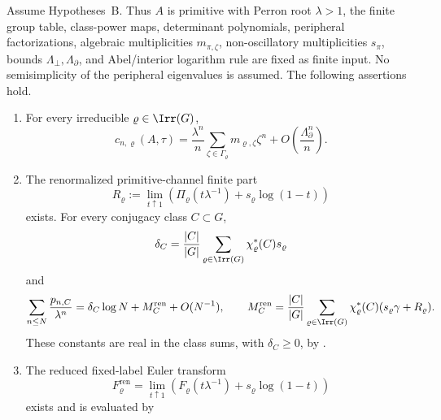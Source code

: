 \begin{theorem}
  \label{thm:perron-boundary-determinant-product}
  \label{thm:peripheral-primitive-channel-asymptotic}
  \label{thm:renormalized-class-mertens}
  \label{thm:renormalized-fixed-label-determinant}
  \label{thm:renormalized-frobenius-product}
  Assume Hypotheses~B.  Thus \(A\) is primitive with Perron root
  \(\lambda>1\), the finite group table, class-power maps, determinant
  polynomials, peripheral factorizations, algebraic multiplicities
  \(m_{\pi,\zeta}\), non-oscillatory multiplicities \(s_\pi\), bounds
  \(\Lambda_\perp,\Lambda_\partial\), and Abel/interior logarithm rule are
  fixed as finite input.  No semisimplicity of the peripheral eigenvalues is
  assumed.  The following assertions hold.
  \begin{enumerate}[label=\textup{(\roman*)},leftmargin=*]
  \item For every irreducible \(\varrho\in\Irr(G)\),
  \begin{equation}\label{eq:peripheral-primitive-channel-asymptotic}
    c_{n,\varrho}(A,\tau)
    =
    \frac{\lambda^n}{n}
      \sum_{\zeta\in\Gamma_\varrho}m_{\varrho,\zeta}\zeta^n
    +
    O\!\left(\frac{\Lambda_\partial^n}{n}\right).
  \end{equation}
  \item The renormalized primitive-channel finite part
  \[
    R_\varrho:=
    \lim_{t\uparrow1}
      \left(\Pi_\varrho(t\lambda^{-1})+s_\varrho\log(1-t)\right)
  \]
  exists.  For every conjugacy class \(C\subset G\),
  \[
    \delta_C=
    \frac{|C|}{|G|}
      \sum_{\varrho\in\Irr(G)}\chi_\varrho^\ast(C)s_\varrho
  \]
  and
  \begin{equation}\label{eq:perron-boundary-main-class-mertens}
    \sum_{n\le N}\frac{p_{n,C}}{\lambda^n}
    =
    \delta_C\log N+M_C^{\mathrm{ren}}+O(N^{-1}),
    \qquad
    M_C^{\mathrm{ren}}=
    \frac{|C|}{|G|}
      \sum_{\varrho\in\Irr(G)}
        \chi_\varrho^\ast(C)(s_\varrho\gamma+R_\varrho).
  \end{equation}
  These constants are real in the class sums, with
  \(\delta_C\ge0\), by
  .
  \item The reduced fixed-label Euler transform
  \[
    F_\varrho^{\mathrm{ren}}
    =
    \lim_{t\uparrow1}
      \left(F_\varrho(t\lambda^{-1})+s_\varrho\log(1-t)\right)
  \]
  exists and is evaluated by
  \begin{equation}\label{eq:perron-boundary-main-fixed-label}

\end{equation}
\end{enumerate}
\end{theorem}
